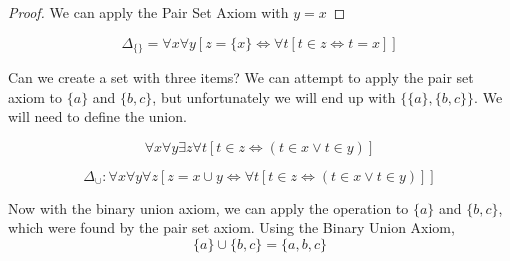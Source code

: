 \begin{proof}
We can apply the Pair Set Axiom with $y = x$
\end{proof}
\begin{defn}
\[\Delta_{\{\}} = \forall x \forall y [z = \{x\} \iff \forall t [t \in z \iff t = x]]\]
\end{defn}
\begin{ex}
Can we create a set with three items? We can attempt to apply the pair set axiom to $\{
a\}$ and $\{b, c\}$, but unfortunately we will end up with $\{\{a\}, \{b, c\}\}$. We will need to define the union.
\end{ex}
\begin{axiom}
\[\forall x \forall y \exists z \forall t [t \in z \iff (t \in x \vee t \in y)]\]
\end{axiom}
\begin{defn}
\[\Delta_\cup : \forall x \forall y \forall z [z = x \cup y \iff \forall t [t \in z \iff (t \in x \vee t \in y)]]\]
\end{defn}
\begin{ex}
Now with the binary union axiom, we can apply the operation to $\{a\}$ and $\{b, c\}$, which were found by the pair set axiom. Using the Binary Union Axiom, 
\[\{a\} \cup \{b, c\} = \{a, b, c\}\]
\end{ex}